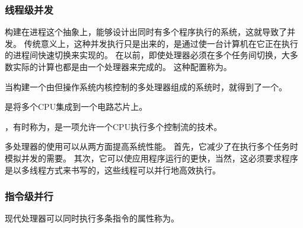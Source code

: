 {{        \subsubsection{线程级并发}
        {
            构建在进程这个抽象上，能够设计出同时有多个程序执行的系统，这就导致了并发。
            传统意义上，这种并发执行只是出来的，是通过使一台计算机在它正在执行的进程间快速切换来实现的。
            在以前，即使处理器必须在多个任务间切换，大多数实际的计算也都是由一个处理器来完成的。
            这种配置称为。

            当构建一个由但操作系统内核控制的多处理器组成的系统时，就得到了一个。

            是将多个CPU集成到一个电路芯片上。

            ，有时称为，是一项允许一个CPU执行多个控制流的技术。

            多处理器的使用可以从两方面提高系统性能。
            首先，它减少了在执行多个任务时模拟并发的需要。
            其次，它可以使应用程序运行的更快，当然，这必须要求程序是以多线程方式来书写的，这些线程可以并行地高效执行。
        }

        \subsubsection{指令级并行}
        {
            现代处理器可以同时执行多条指令的属性称为。
        }
    }
}
